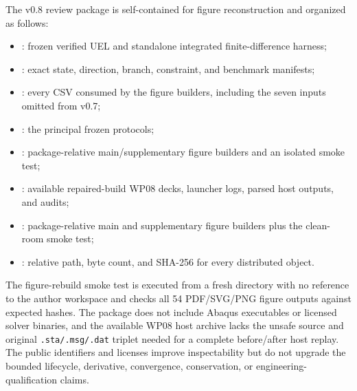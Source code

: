 \documentclass[preprint,12pt,authoryear]{elsarticle}
\begin{document}
The v0.8 review package is self-contained for figure reconstruction and organized as follows:
\begin{itemize}
\item {}: frozen verified UEL and standalone integrated finite-difference harness;
\item {}: exact state, direction, branch, constraint, and benchmark manifests;
\item {}: every CSV consumed by the figure builders, including the seven inputs omitted from v0.7;
\item {}: the principal frozen protocols;
\item {}: package-relative main/supplementary figure builders and an isolated smoke test;
\item {}: available repaired-build WP08 decks, launcher logs, parsed host outputs, and audits;
\item {}: package-relative main and supplementary figure builders plus the clean-room smoke test;
\item {}: relative path, byte count, and SHA-256 for every distributed object.
\end{itemize}

The figure-rebuild smoke test is executed from a fresh directory with no reference to the author workspace and checks all 54 PDF/SVG/PNG figure outputs against expected hashes. The package does not include Abaqus executables or licensed solver binaries, and the available WP08 host archive lacks the unsafe source and original \texttt{.sta/.msg/.dat} triplet needed for a complete before/after host replay. The public identifiers and licenses improve inspectability but do not upgrade the bounded lifecycle, derivative, convergence, conservation, or engineering-qualification claims.



\end{document}
